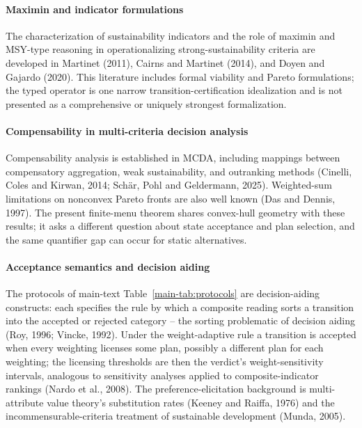 \documentclass[preprint,11pt,authoryear]{elsarticle}
\theoremstyle{remark}
\begin{document}
\paragraph{Maximin and indicator formulations} The characterization of sustainability indicators and the role of maximin and MSY-type reasoning in operationalizing strong-sustainability criteria are developed in Martinet (2011), Cairns and Martinet (2014), and Doyen and Gajardo (2020). This literature includes formal viability and Pareto formulations; the typed operator is one narrow transition-certification idealization and is not presented as a comprehensive or uniquely strongest formalization.

\paragraph{Compensability in multi-criteria decision analysis} Compensability analysis is established in MCDA, including mappings between compensatory aggregation, weak sustainability, and outranking methods (Cinelli, Coles and Kirwan, 2014; Sch\"ar, Pohl and Geldermann, 2025). Weighted-sum limitations on nonconvex Pareto fronts are also well known (Das and Dennis, 1997). The present finite-menu theorem shares convex-hull geometry with these results; it asks a different question about state acceptance and plan selection, and the same quantifier gap can occur for static alternatives.

\paragraph{Acceptance semantics and decision aiding} The protocols of main-text Table~\ref{main-tab:protocols} are decision-aiding constructs: each specifies the rule by which a composite reading sorts a transition into the accepted or rejected category -- the sorting problematic of decision aiding (Roy, 1996; Vincke, 1992). Under the weight-adaptive rule a transition is accepted when every weighting licenses some plan, possibly a different plan for each weighting; the licensing thresholds are then the verdict's weight-sensitivity intervals, analogous to sensitivity analyses applied to composite-indicator rankings (Nardo et al., 2008). The preference-elicitation background is multi-attribute value theory's substitution rates (Keeney and Raiffa, 1976) and the incommensurable-criteria treatment of sustainable development (Munda, 2005).
\end{document}
